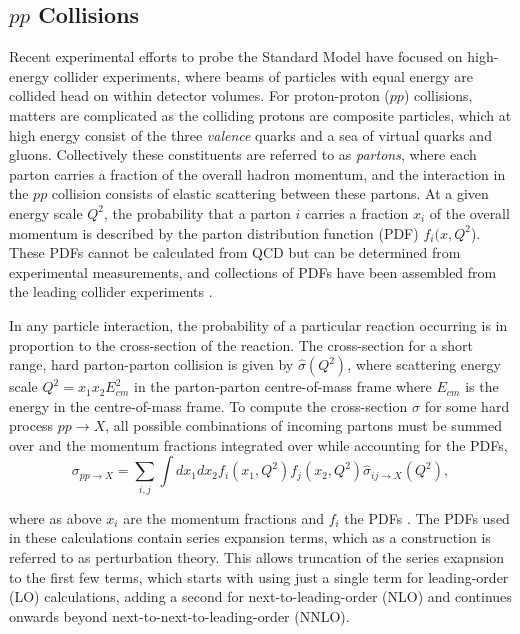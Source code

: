 	\subsection{$pp$ Collisions}
	\label{t:ppc}
	Recent experimental efforts to probe the Standard Model have focused on high-energy collider experiments, where beams of particles with equal energy are collided head on within detector volumes.  For proton-proton ($pp$) collisions, matters are complicated as the colliding protons are composite particles, which at high energy consist of the three \textit{valence} quarks and a sea of virtual quarks and gluons. Collectively these constituents are referred to as \textit{partons}, where each parton carries a fraction of the overall hadron momentum, and the interaction in the $pp$ collision consists of elastic scattering between these partons. At a given energy scale $Q^2$, the probability that a parton $i$ carries a fraction $x_i$ of the overall momentum is described by the parton distribution function (PDF) $f_i(x, Q^2$). These PDFs cannot be calculated from QCD but can be determined from experimental measurements, and collections of PDFs have been assembled from the leading collider experiments \cite{hardinteractions, pdfs}.

	In any particle interaction, the probability of a particular reaction occurring is in proportion to the cross-section of the reaction. The cross-section for a short range, hard parton-parton collision is given by $\hat{\sigma}(Q^2)$, where scattering energy scale $Q^2 = x_1x_2E^2_{cm}$ in the parton-parton centre-of-mass frame where $E_{cm}$ is the energy in the centre-of-mass frame. To compute the cross-section $\sigma$ for some hard process $pp\rightarrow X$, all possible combinations of incoming partons must be summed over and the momentum fractions integrated over while accounting for the PDFs,
	\begin{equation}
	\label{eq:hard}
	\sigma_{pp\rightarrow X} = \sum_{i, j} \int dx_1dx_2f_i(x_1, Q^2)f_j(x_2, Q^2)\hat{\sigma}_{ij\rightarrow X}(Q^2),
	\end{equation}

	where as above $x_i$ are the momentum fractions and $f_i$ the PDFs \cite{hardinteractions}. The PDFs used in these calculations contain series expansion terms, which as a construction is referred to as perturbation theory. This allows truncation of the series exapnsion to the first few terms, which starts with using just a single term for leading-order (LO) calculations, adding a second for next-to-leading-order (NLO) and continues onwards beyond next-to-next-to-leading-order (NNLO)\cite{hardinteractions}.
